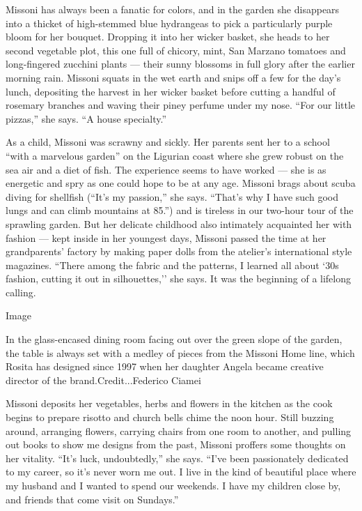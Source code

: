 Missoni has always been a fanatic for colors, and in the garden she
disappears into a thicket of high-stemmed blue hydrangeas to pick a
particularly purple bloom for her bouquet. Dropping it into her wicker
basket, she heads to her second vegetable plot, this one full of
chicory, mint, San Marzano tomatoes and long-fingered zucchini plants
--- their sunny blossoms in full glory after the earlier morning rain.
Missoni squats in the wet earth and snips off a few for the day's lunch,
depositing the harvest in her wicker basket before cutting a handful of
rosemary branches and waving their piney perfume under my nose. ``For
our little pizzas,'' she says. ``A house specialty.''

As a child, Missoni was scrawny and sickly. Her parents sent her to a
school ``with a marvelous garden'' on the Ligurian coast where she grew
robust on the sea air and a diet of fish. The experience seems to have
worked --- she is as energetic and spry as one could hope to be at any
age. Missoni brags about scuba diving for shellfish (``It's my
passion,'' she says. ``That's why I have such good lungs and can climb
mountains at 85.'') and is tireless in our two-hour tour of the
sprawling garden. But her delicate childhood also intimately acquainted
her with fashion --- kept inside in her youngest days, Missoni passed
the time at her grandparents' factory by making paper dolls from the
atelier's international style magazines. ``There among the fabric and
the patterns, I learned all about `30s fashion, cutting it out in
silhouettes,'' she says. It was the beginning of a lifelong calling.

Image

In the glass-encased dining room facing out over the green slope of the
garden, the table is always set with a medley of pieces from the Missoni
Home line, which Rosita has designed since 1997 when her daughter Angela
became creative director of the brand.Credit...Federico Ciamei

Missoni deposits her vegetables, herbs and flowers in the kitchen as the
cook begins to prepare risotto and church bells chime the noon hour.
Still buzzing around, arranging flowers, carrying chairs from one room
to another, and pulling out books to show me designs from the past,
Missoni proffers some thoughts on her vitality. ``It's luck,
undoubtedly,'' she says. ``I've been passionately dedicated to my
career, so it's never worn me out. I live in the kind of beautiful place
where my husband and I wanted to spend our weekends. I have my children
close by, and friends that come visit on Sundays.''

